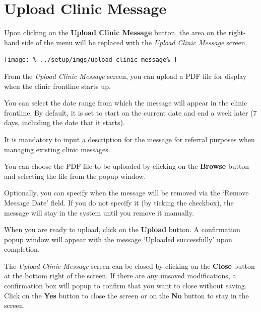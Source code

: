 \documentclass[../main/main]{subfiles}
\begin{document}
\newpage
\section{Upload Clinic Message}
\label{sec:upload-clinic-message}

Upon clicking on the \textbf{Upload Clinic Message} button,
the area on the right-hand side of the menu will be replaced with the
\emph{Upload Clinic Message} screen.

\texttt{[image: \%
  ../setup/imgs/upload-clinic-message\%
]}

From the \emph{Upload Clinic Message} screen, you can upload a PDF file for
display when the clinic frontline starts up.

You can select the date range from which the message will appear in the clinic
frontline. By default, it is set to start on the current date and end a week
later (7 days, including the date that it starts).

It is mandatory to input a description for the message for referral purposes
when managing existing clinic messages.

You can choose the PDF file to be uploaded by clicking on the \textbf{Browse}
button and selecting the file from the popup window.

Optionally, you can specify when the message will be removed via the `Remove
Message Date' field. If you do not specify it (by ticking the checkbox), the
message will stay in the system until you remove it manually.

When you are ready to upload, click on the \textbf{Upload} button.
A confirmation popup window will appear with the message `Uploaded successfully'
upon completion.

The \emph{Upload Clinic Message} screen can be closed by clicking on the
\textbf{Close} button at the bottom right of the screen. If there are any
unsaved modifications, a confirmation box will popup to confirm that you want
to close without saving. Click on the \textbf{Yes} button to close the screen
or on the \textbf{No} button to stay in the screen.
\end{document}
